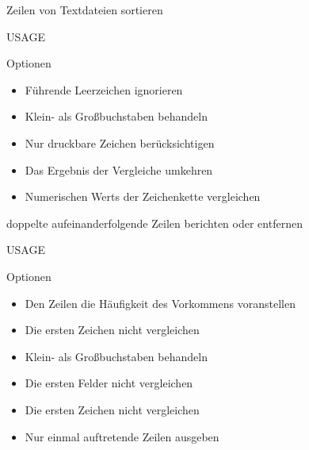 \documentclass[aspectratio=43]{beamer}
\begin{document}
\begin{frame} 
	\begin{block}{} 
        Zeilen von Textdateien sortieren
	\end{block}
	\begin{block}{USAGE} 
	\end{block}
	\begin{exampleblock}{Optionen} 
	\begin{itemize}
	\item {} Führende Leerzeichen ignorieren
	\item {} Klein- als Großbuchstaben behandeln
	\item {} Nur druckbare Zeichen berücksichtigen
	\item {} Das Ergebnis der Vergleiche umkehren
	\item {} Numerischen Werts der Zeichenkette vergleichen
	\end{itemize}
	\end{exampleblock}
\end{frame}

\begin{frame} 
	\begin{block}{} 
        doppelte aufeinanderfolgende Zeilen berichten oder entfernen
	\end{block}
	\begin{block}{USAGE} 
	\end{block}
	\begin{exampleblock}{Optionen} 
	\vspace{-0.3cm}
	\begin{itemize}
	\item {} Den Zeilen die Häufigkeit des Vorkommens voranstellen
	\item {}   Die ersten  Zeichen nicht vergleichen
	\item {} Klein- als Großbuchstaben behandeln
	\item {} Die ersten  Felder nicht vergleichen
	\item {} Die ersten  Zeichen nicht vergleichen
	\item {} Nur einmal auftretende Zeilen ausgeben	
	\end{itemize}
	\end{exampleblock}
\end{frame}
\end{document}
